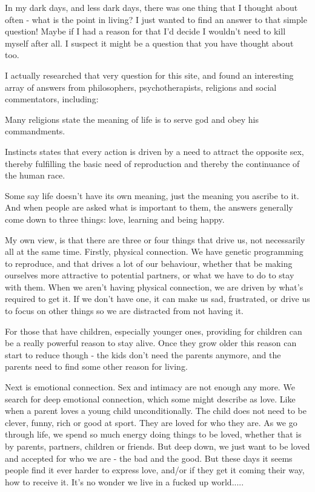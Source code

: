 \documentclass[12pt]{article}
\begin{document}
In my dark days, and less dark days, there was one thing that I thought about often - what is the point in living? I just wanted to find an answer to that simple question! Maybe if I had a reason for that I'd decide I wouldn't need to kill myself after all. I suspect it might be a question that you have thought about too.

I actually researched that very question for this site, and found an interesting array of answers from philosophers, psychotherapists, religions and social commentators, including:

Many religions state the meaning of life is to serve god and obey his commandments.
 
Instincts states that every action is driven by a need to attract the opposite sex, thereby fulfilling the basic need of reproduction and thereby the continuance of the human race.
 
Some say life doesn't have its own meaning, just the meaning you ascribe to it. And when people are asked what is important to them, the answers generally come down to three things: love, learning and being happy.

My own view, is that there are three or four things that drive us, not necessarily all at the same time. Firstly, physical connection. We have genetic programming to reproduce, and that drives a lot of our behaviour, whether that be making ourselves more attractive to potential partners, or what we have to do to stay with them. When we aren't having physical connection, we are driven by what's required to get it. If we don't have one, it can make us sad, frustrated, or drive us to focus on other things so we are distracted from not having it.

For those that have children, especially younger ones, providing for children can be a really powerful reason to stay alive. Once they grow older this reason can start to reduce though - the kids don't need the parents anymore, and the parents need to find some other reason for living.

Next is emotional connection. Sex and intimacy are not enough any more. We search for deep emotional connection, which some might describe as love. Like when a parent loves a young child unconditionally. The child does not need to be clever, funny, rich or good at sport. They are loved for who they are. As we go through life, we spend so much energy doing things to be loved, whether that is by parents, partners, children or friends. But deep down, we just want to be loved and accepted for who we are - the bad and the good. But these days it seems people find it ever harder to express love, and/or if they get it coming their way, how to receive it. It's no wonder we live in a fucked up world.....
\end{document}
